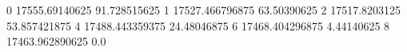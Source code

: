 0 17555.69140625 91.728515625
1 17527.466796875 63.50390625
2 17517.8203125 53.857421875
4 17488.443359375 24.48046875
6 17468.404296875 4.44140625
8 17463.962890625 0.0
